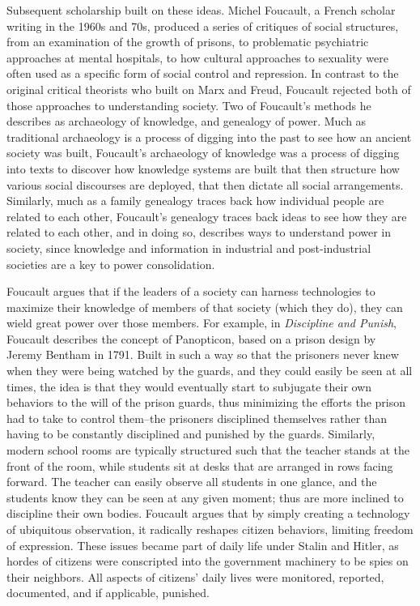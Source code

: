\documentclass[sigconf]{acmart}
\begin{document}
Subsequent scholarship built on these ideas.  Michel Foucault, a French scholar writing in the 1960s and 70s, produced a series of critiques of social structures, from an examination of the growth of prisons, to problematic psychiatric approaches at mental hospitals, to how cultural approaches to sexuality were often used as a specific form of social control and repression.  In contrast to the original critical theorists who built on Marx and Freud, Foucault rejected both of those approaches to understanding society.  Two of Foucault's methods he describes as archaeology of knowledge, and genealogy of power. \cite{ritzer18,seidman16}  Much as traditional archaeology is a process of digging into the past to see how an ancient society was built, Foucault's archaeology of knowledge was a process of digging into texts to discover how knowledge systems are built that then structure how various social discourses are deployed, that then dictate all social arrangements.  Similarly, much as a family genealogy traces back how individual people are related to each other, Foucault's genealogy traces back ideas to see how they are related to each other, and in doing so, describes ways to understand power in society, since knowledge and information in industrial and post-industrial societies are a key to power consolidation.  

Foucault argues that if the leaders of a society can harness technologies to maximize their knowledge of members of that society (which they do), they can wield great power over those members.  For example, in {\em Discipline and Punish}, Foucault describes the concept of Panopticon, based on a prison design by Jeremy Bentham in 1791. Built in such a way so that the prisoners never knew when they were being watched by the guards, and they could easily be seen at all times, the idea is that they would eventually start to subjugate their own behaviors to the will of the prison guards, thus minimizing the efforts the prison had to take to control them--the prisoners disciplined themselves rather than having to be constantly disciplined and punished by the guards. \cite{foucault77}  Similarly, modern school rooms are typically structured such that the teacher stands at the front of the room, while students sit at desks that are arranged in rows facing forward.  The teacher can easily observe all students in one glance, and the students know they can be seen at any given moment; thus are more inclined to discipline their own bodies.  Foucault argues that by simply creating a technology of ubiquitous observation, it radically reshapes citizen behaviors, limiting freedom of expression.  These issues became part of daily life under Stalin and Hitler, as hordes of citizens were conscripted into the government machinery to be spies on their neighbors.  All aspects of citizens' daily lives were monitored, reported, documented, and if applicable, punished.
\end{document}
